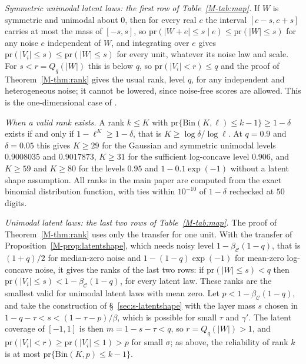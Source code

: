 \documentclass[12pt]{article}
\renewcommand{\_}{\usc\allowbreak}
\theoremstyle{definition}
\numberwithin{equation}{section}
\newcommand{\pr}{\mathrm{pr}}
\newcommand{\E}{\mathcal{C}}
\newcommand{\Bin}{\mathrm{Bin}}
\begin{document}
\emph{Symmetric unimodal latent laws: the first row of Table~\ref{M-tab:map}.} If $W$ is symmetric and unimodal about $0$, then for every real $c$ the interval $[c - s, c + s]$ carries at most the mass of $[-s, s]$, so $\pr(|W + e| \le s \mid e) \le \pr(|W| \le s)$ for any noise $e$ independent of $W$, and integrating over $e$ gives $\pr(|V_i| \le s) \le \pr(|W| \le s)$ for every unit, whatever its noise law and scale. For $s < r = Q_q(|W|)$ this is below $q$, so $\pr(|V_i| < r) \le q$ and the proof of Theorem~\ref{M-thm:rank} gives the usual rank, level $q$, for any independent and heterogeneous noise; it cannot be lowered, since noise-free scores are allowed. This is the one-dimensional case of \citet{anderson1955}.

\emph{When a valid rank exists.} A rank $k \le K$ with $\pr\{\Bin(K, \ell) \le k - 1\} \ge 1 - \delta$ exists if and only if $1 - \ell^K \ge 1 - \delta$, that is $K \ge \log\delta/\log\ell$. At $q = 0.9$ and $\delta = 0.05$ this gives $K \ge 29$ for the Gaussian and symmetric unimodal levels $0.9008035$ and $0.9017873$, $K \ge 31$ for the sufficient log-concave level $0.906$, and $K \ge 59$ and $K \ge 80$ for the levels $0.95$ and $1 - 0.1\exp(-1)$ without a latent shape assumption. All ranks in the main paper are computed from the exact binomial distribution function, with ties within $10^{-10}$ of $1 - \delta$ rechecked at $50$ digits.

\emph{Unimodal latent laws: the last two rows of Table~\ref{M-tab:map}.} The proof of Theorem~\ref{M-thm:rank} uses only the transfer for one unit. With the transfer of Proposition~\ref{M-prop:latentshape}, which needs noisy level $1 - \beta_{\E}(1 - q)$, that is $(1 + q)/2$ for median-zero noise and $1 - (1 - q)\exp(-1)$ for mean-zero log-concave noise, it gives the ranks of the last two rows: if $\pr(|W| \le s) < q$ then $\pr(|V_i| \le s) < 1 - \beta_{\E}(1 - q)$, for every latent law. These ranks are the smallest valid for unimodal latent laws with mean zero. Let $p < 1 - \beta_{\E}(1 - q)$, and take the construction of \S~\ref{sec:s-latentshape} with the layer mass $s$ chosen in $1 - q - \tau < s < (1 - \tau - p)/\beta$, which is possible for small $\tau$ and $\gamma'$. The latent coverage of $[-1, 1]$ is then $m = 1 - s - \tau < q$, so $r = Q_q(|W|) > 1$, and $\pr(|V_i| < r) \ge \pr(|V_i| \le 1) > p$ for small $\sigma$; as above, the reliability of rank $k$ is at most $\pr\{\Bin(K, p) \le k - 1\}$.
\end{document}
